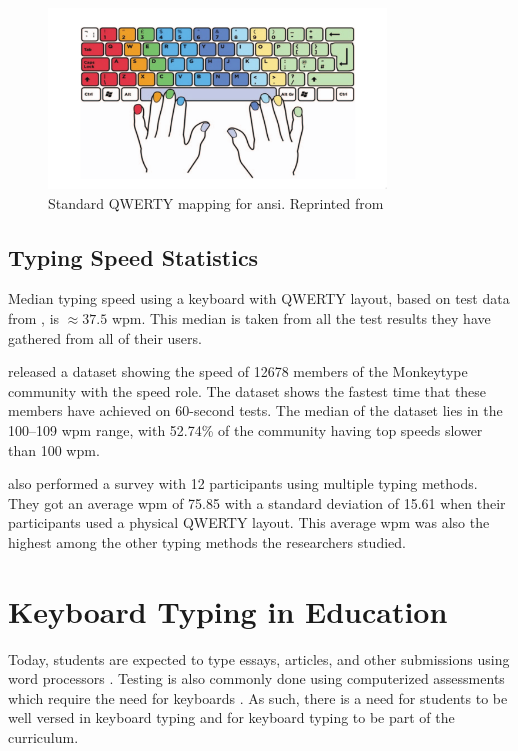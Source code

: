\documentclass{report}
\begin{document}
\begin{figure}[H]
	\centering
	\includegraphics[width=0.8\textwidth]{touch-type.png}
	\caption{Standard QWERTY mapping for \ac{ansi}. Reprinted from }
	\label{fig:touch-type}
	\centering
\end{figure}

\subsection{Typing Speed Statistics}

Median typing speed using a keyboard with QWERTY layout, based on test data
from \cite{keybr}, is $\approx37.5$ \ac{wpm}. This median is taken from all the test results they have gathered from all of their users.

\cite{monkey-stats} released a dataset showing the speed of 12678 members of the
Monkeytype community with the speed role. The dataset shows the fastest time
that these members have achieved on 60-second tests. The median of the dataset
lies in the 100--109 \ac{wpm} range, with 52.74\% of the community having top
speeds slower than 100 \ac{wpm}.

\cite{arif2009} also performed a survey with 12 participants using
multiple typing methods. They got an average \ac{wpm} of 75.85 with a standard
deviation of 15.61 when their participants used a physical QWERTY layout. This
average \ac{wpm} was also the highest among the other typing methods the
researchers studied.

\section{Keyboard Typing in Education}

Today, students are expected to type essays, articles, and other submissions
using word processors \parencite{poole2016}. Testing is also commonly done using
computerized assessments which require the need for keyboards
\parencite{moodle}. As such, there is a need for students to be well versed in
keyboard typing and for keyboard typing to be part of the curriculum.
\end{document}
